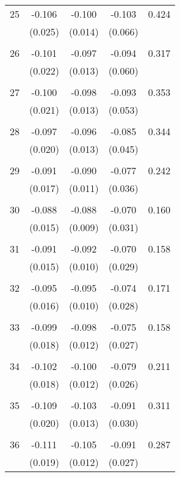 \begin{tabular}{l*{1}{cccc}}
  25       & -0.106 & -0.100 & -0.103 & 0.424 \\
          & (0.025) & (0.014) & (0.066) & \\
 & & & &\\
  26       & -0.101 & -0.097 & -0.094 & 0.317 \\
          & (0.022) & (0.013) & (0.060) & \\
 & & & &\\
  27       & -0.100 & -0.098 & -0.093 & 0.353 \\
          & (0.021) & (0.013) & (0.053) & \\
 & & & &\\
  28       & -0.097 & -0.096 & -0.085 & 0.344 \\
          & (0.020) & (0.013) & (0.045) & \\
 & & & &\\
  29       & -0.091 & -0.090 & -0.077 & 0.242 \\
          & (0.017) & (0.011) & (0.036) & \\
 & & & &\\
  30       & -0.088 & -0.088 & -0.070 & 0.160 \\
          & (0.015) & (0.009) & (0.031) & \\
 & & & &\\
  31       & -0.091 & -0.092 & -0.070 & 0.158 \\
          & (0.015) & (0.010) & (0.029) & \\
 & & & &\\
  32       & -0.095 & -0.095 & -0.074 & 0.171 \\
          & (0.016) & (0.010) & (0.028) & \\
 & & & &\\
  33       & -0.099 & -0.098 & -0.075 & 0.158 \\
          & (0.018) & (0.012) & (0.027) & \\
 & & & &\\
  34       & -0.102 & -0.100 & -0.079 & 0.211 \\
          & (0.018) & (0.012) & (0.026) & \\
 & & & &\\
  35       & -0.109 & -0.103 & -0.091 & 0.311 \\
          & (0.020) & (0.013) & (0.030) & \\
 & & & &\\
  36       & -0.111 & -0.105 & -0.091 & 0.287 \\
          & (0.019) & (0.012) & (0.027) & \\

\end{tabular}
